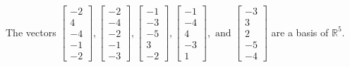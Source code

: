 \begin{exercise}
\begin{exerciseStatement}
  \end{exerciseStatement}
  \begin{exerciseAnswer}
   The vectors \(\left[\begin{array}{r}
-2 \\
4 \\
-4 \\
-1 \\
-2
\end{array}\right] , \left[\begin{array}{r}
-2 \\
-4 \\
-2 \\
-1 \\
-3
\end{array}\right] , \left[\begin{array}{r}
-1 \\
-3 \\
-5 \\
3 \\
-2
\end{array}\right] , \left[\begin{array}{r}
-1 \\
-4 \\
4 \\
-3 \\
1
\end{array}\right] , \text{ and } \left[\begin{array}{r}
-3 \\
3 \\
2 \\
-5 \\
-4
\end{array}\right]\) 
  	 are  a basis of \(\mathbb{R}^5\).
  


  \end{exerciseAnswer}
\end{exercise}